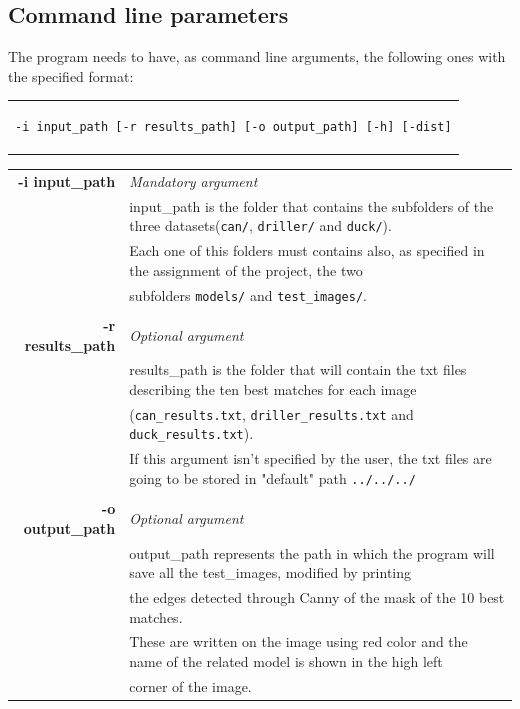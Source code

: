 \documentclass{article}
\begin{document}
\subsection{Command line parameters}\label{args}
The program needs to have, as command line arguments, the following ones with the specified format:
\begin{center}
\begin{tabular}{c}
\begin{lstlisting}[linewidth=320pt, basicstyle=\footnotesize\sffamily,]
-i input_path [-r results_path] [-o output_path] [-h] [-dist]
\end{lstlisting}
\end{tabular}
\end{center}
\begin{table}[h]
\footnotesize\centering
\begin{tabular}{rl}
\textbf{-i input\_path} & {\textit{Mandatory argument}}\\
& {input\_path is the folder that contains the subfolders of the three datasets(\texttt{can/}, \texttt{driller/} and \texttt{duck/})}.\\
& {Each one of this folders must contains also, as specified in the assignment of the project, the two}\\
&{subfolders \texttt{models/} and \texttt{test\_images/}.}\\
&\\
\textbf{-r results\_path} & {\textit{Optional argument}}\\
& {results\_path is the folder that will contain the txt files describing the ten best matches for each image}\\
& {(\texttt{can\_results.txt}, \texttt{driller\_results.txt} and \texttt{duck\_results.txt}).}\\
& {If this argument isn't specified by the user, the txt files are going to be stored in "default" path \texttt{../../../}}\\
&\\
\textbf{-o output\_path} & {\textit{Optional argument}}\\
& {output\_path represents the path in which the program will save all the test\_images, modified by printing}\\
&{the edges detected through Canny of the mask of the 10 best matches.}\\
&{These are written on the image using red color and the name of the related model is shown in the high left }\\
&{corner of the image.} \\

\end{tabular}
\end{table}
\end{document}
